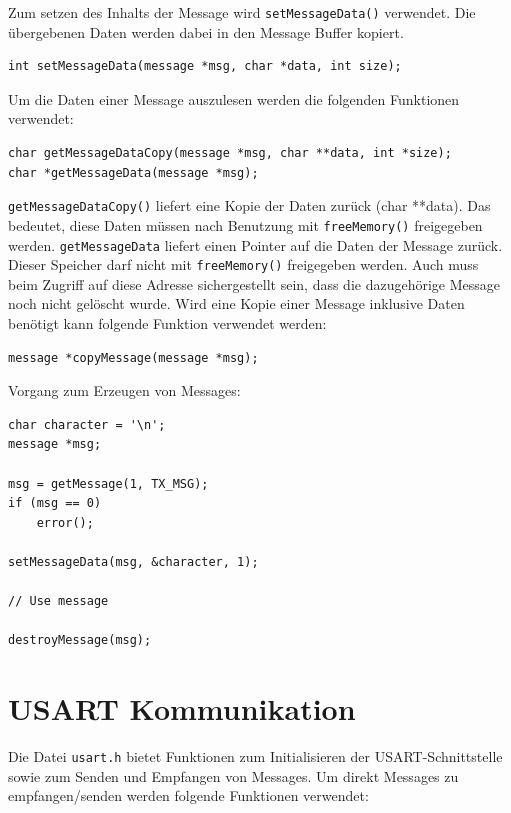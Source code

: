 \documentclass[fontsize=12pt, toc=bibliography, notitlepage]{scrreprt}
\begin{document}
Zum setzen des Inhalts der Message wird \lstinline$setMessageData()$ verwendet. Die übergebenen Daten werden dabei in den Message Buffer kopiert.\\

\begin{lstlisting}
int setMessageData(message *msg, char *data, int size);
\end{lstlisting}

Um die Daten einer Message auszulesen werden die folgenden Funktionen verwendet:\\

\begin{lstlisting}
char getMessageDataCopy(message *msg, char **data, int *size);
char *getMessageData(message *msg);
\end{lstlisting}

\lstinline$getMessageDataCopy()$ liefert eine Kopie der Daten zurück (char **data). Das bedeutet, diese Daten müssen nach Benutzung mit \lstinline$freeMemory()$  freigegeben werden. \lstinline$getMessageData$ liefert einen Pointer auf die Daten der Message zurück. Dieser Speicher darf nicht mit \lstinline$freeMemory()$  freigegeben werden. Auch muss beim Zugriff auf diese Adresse sichergestellt sein, dass die dazugehörige Message noch nicht gelöscht wurde. Wird eine Kopie einer Message inklusive Daten benötigt kann folgende Funktion verwendet werden:\\

\begin{lstlisting}
message *copyMessage(message *msg);
\end{lstlisting}

Vorgang zum Erzeugen von Messages:\\

\begin{lstlisting}
char character = '\n';
message *msg;

msg = getMessage(1, TX_MSG);
if (msg == 0)
	error();
	
setMessageData(msg, &character, 1);

// Use message

destroyMessage(msg);
\end{lstlisting}

\section{USART Kommunikation}
\label{subsec:shell-communication}
Die Datei \lstinline$usart.h$ bietet Funktionen zum Initialisieren der USART-Schnittstelle sowie zum Senden und Empfangen von Messages. Um direkt Messages zu empfangen/senden werden folgende Funktionen verwendet:\\
\end{document}
